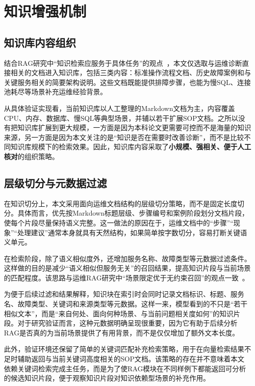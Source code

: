 \section{知识增强机制}

\subsection{知识库内容组织}

结合RAG研究中“知识检索应服务于具体任务”的观点~\cite{gao2023ragsurvey,jiang2023active}，本文仅选取与运维诊断直接相关的文档进入知识库，包括三类内容：标准操作流程文档、历史故障案例和与关键服务相关的简要架构说明。这些文档既能提供排障步骤，也能为慢SQL、连接池耗尽等场景补充运维经验背景。

从具体验证实现看，当前知识库以人工整理的Markdown文档为主，内容覆盖CPU、内存、数据库、慢SQL等典型场景，并辅以若干扩展SOP文档。之所以没有把知识库扩展到更大规模，一方面是因为本科论文更需要可控而不是海量的知识来源，另一方面是因为本文关注的是“知识是否在需要时改善诊断”，而不是比较不同知识库规模下的检索效果。因此，知识库内容采取了\textbf{小规模、强相关、便于人工核对}的组织策略。

\subsection{层级切分与元数据过滤}

在知识切分上，本文采用面向运维文档结构的层级切分策略，而不是固定长度切分。具体而言，优先按Markdown标题层级、步骤编号和案例阶段划分文档片段，使每个片段尽量保持语义完整。这一做法的原因在于，运维文档中的“步骤”“现象”“处理建议”通常本身就具有天然结构，如果简单按字数切分，容易打断关键语义单元。

在检索阶段，除了语义相似度外，还增加服务名称、故障类型等元数据过滤条件。这样做的目的是减少“语义相似但服务无关”的召回结果，提高知识片段与当前场景的匹配程度。该思路与运维RAG研究中“场景限定优于无约束召回”的观点一致~\cite{zhang2024rag4itops,isaza2024ragincident}。

为便于后续过滤和结果解释，知识块在索引时会同时记录文档标识、标题、服务名、故障类型、关键词和来源类型等元数据。这样一来，模型看到的不只是“若干相似文本”，而是“来自何处、面向何种场景、与当前问题相关度如何”的知识片段。对于研究验证而言，这种元数据明确呈现很重要，因为它有助于后续分析RAG是否真的为当前场景提供了有用背景，而不是仅仅增加了额外文本长度。

此外，验证环境还保留了简单的关键词匹配补充检索策略，用于在向量检索结果不足时辅助返回与当前关键词高度相关的SOP文档。该策略的存在并不意味着本文依赖关键词检索完成主任务，而是为了使RAG模块在不同样例下都能返回可分析的候选知识片段，便于观察知识片段对知识依赖型场景的补充作用。

